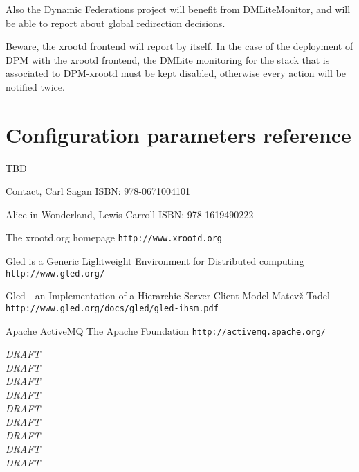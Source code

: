 \documentclass[12pt]{article} %
\begin{document}
 Also the Dynamic Federations project will benefit from DMLiteMonitor, and will be able to report about global redirection decisions.

Beware, the xrootd frontend will report by itself. In the case of the deployment of DPM with the xrootd frontend,
the DMLite monitoring for the stack that is associated to DPM-xrootd must be kept disabled, otherwise every action will be notified twice.\\



\section{Configuration parameters reference}

TBD


\begin{thebibliography}{9}

 Contact,
Carl Sagan
ISBN: 978-0671004101

 Alice in Wonderland,
Lewis Carroll
ISBN: 978-1619490222

 The xrootd.org homepage
\verb"http://www.xrootd.org"

 Gled is a Generic Lightweight Environment for Distributed computing
\verb"http://www.gled.org/"

 Gled - an Implementation of a Hierarchic Server-Client Model
Matev\v{z} Tadel
\verb"http://www.gled.org/docs/gled/gled-ihsm.pdf"

 Apache ActiveMQ
The Apache Foundation
\verb"http://activemq.apache.org/"




\end{thebibliography}


\emph{DRAFT}\\

\emph{DRAFT}\\

\emph{DRAFT}\\

\emph{DRAFT}\\

\emph{DRAFT}\\

\emph{DRAFT}\\

\emph{DRAFT}\\

\emph{DRAFT}\\

\emph{DRAFT}\\
\end{document}

